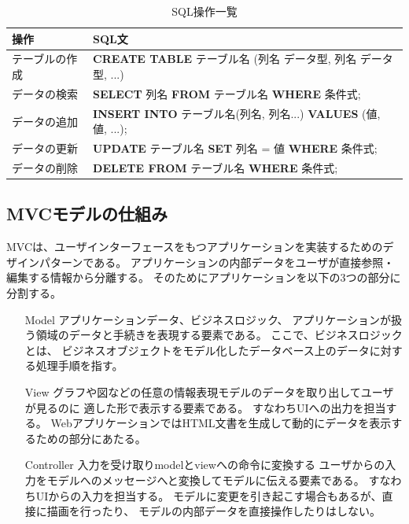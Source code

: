 \documentclass[12pt]{jarticle}
\begin{document}
\begin{table}[htb]
    \begin{center}
        \caption{SQL操作一覧}
        \begin{tabular}{|l|l|}
            \hline
            操作           & SQL文                                                                   \\
            \hline
            テーブルの作成 & {\bf CREATE TABLE} テーブル名 (列名 データ型, 列名 データ型, ...)       \\
            データの検索   & {\bf SELECT} 列名 {\bf FROM} テーブル名 {\bf WHERE} 条件式;             \\
            データの追加   & {\bf INSERT INTO} テーブル名(列名, 列名...) {\bf VALUES} (値, 値, ...); \\
            データの更新   & {\bf UPDATE} テーブル名 {\bf SET} 列名 = 値 {\bf WHERE} 条件式;         \\
            データの削除   & {\bf DELETE FROM} テーブル名 {\bf WHERE} 条件式;                        \\
            \hline
        \end{tabular}
    \end{center}
\end{table}

\subsection{MVCモデルの仕組み}
MVCは、ユーザインターフェースをもつアプリケーションを実装するためのデザインパターンである。
アプリケーションの内部データをユーザが直接参照・編集する情報から分離する。
そのためにアプリケーションを以下の3つの部分に分割する。
\begin{itemize}
    \item[Model]アプリケーションデータ、ビジネスロジック、
          アプリケーションが扱う領域のデータと手続きを表現する要素である。
          ここで、ビジネスロジックとは、
          ビジネスオブジェクトをモデル化したデータベース上のデータに対する処理手順を指す。
    \item [View]グラフや図などの任意の情報表現モデルのデータを取り出してユーザが見るのに
          適した形で表示する要素である。
          すなわちUIへの出力を担当する。
          WebアプリケーションではHTML文書を生成して動的にデータを表示するための部分にあたる。
    \item [Controller]入力を受け取りmodelとviewへの命令に変換する
          ユーザからの入力をモデルへのメッセージへと変換してモデルに伝える要素である。
          すなわちUIからの入力を担当する。
          モデルに変更を引き起こす場合もあるが、直接に描画を行ったり、
          モデルの内部データを直接操作したりはしない。
\end{itemize}
\end{document}
